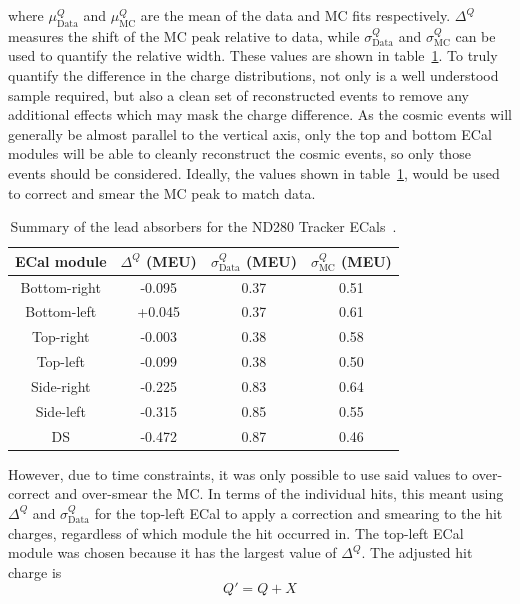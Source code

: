 where $\mu_{\textrm{Data}}^Q$ and $\mu_{\textrm{MC}}^Q$ are the mean of the data and MC fits respectively.  $\Delta^Q$ measures the shift of the MC peak relative to data, while $\sigma_{\textrm{Data}}^{Q}$ and $\sigma_{\textrm{MC}}^{Q}$ can be used to quantify the relative width.  These values are shown in table~\ref{table:HitChargeFitValues}.  To truly quantify the difference in the charge distributions, not only is a well understood sample required, but also a clean set of reconstructed events to remove any additional effects which may mask the charge difference.  As the cosmic events will generally be almost parallel to the vertical axis, only the top and bottom ECal modules will be able to cleanly reconstruct the cosmic events, so only those events should be considered.  Ideally, the values shown in table~\ref{table:HitChargeFitValues}, would be used to correct and smear the MC peak to match data.  
\begin{table}
  \begin{tabular}{ c c c c }
   ECal module & $\Delta^{Q}$ (MEU) & $\sigma_{\textrm{Data}}^Q$ (MEU) & $\sigma_{\textrm{MC}}^Q$ (MEU) \\ \hline \hline
   Bottom-right & -0.095 & 0.37 & 0.51 \\
   Bottom-left & +0.045 & 0.37 & 0.61 \\
   Top-right & -0.003 & 0.38 & 0.58 \\
   Top-left & -0.099 & 0.38 & 0.50 \\ \hline
   Side-right & -0.225 & 0.83 & 0.64 \\
   Side-left & -0.315 & 0.85 & 0.55 \\
   DS & -0.472 & 0.87 & 0.46 \\
  \end{tabular}
  \caption{Summary of the lead absorbers for the ND280 Tracker ECals~\cite{1748-0221-8-10-P10019}.}
  \label{table:HitChargeFitValues}
\end{table}
However, due to time constraints, it was only possible to use said values to over-correct and over-smear the MC.  In terms of the individual hits, this meant using $\Delta^{Q}$ and $\sigma_{\textrm{Data}}^Q$ for the top-left ECal to apply a correction and smearing to the hit charges, regardless of which module the hit occurred in.  The top-left ECal module was chosen because it  has the largest value of $\Delta^{Q}$.  The adjusted hit charge is
\begin{equation}
Q' = Q + X
\label{eqn:HitChargeCorrection}
\end{equation}
